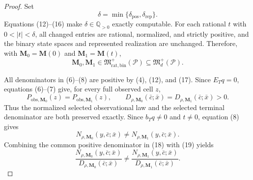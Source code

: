 \documentclass{article}
\begin{document}
\begin{proof}
Set
\[
 \delta=\min\{\delta_{\mathrm{pos}},\delta_{\mathrm{rep}}\}. \tag{16}
\]
Equations (12)--(16) make \(\delta\in\mathbb Q_{>0}\) exactly computable.  For each rational \(t\) with \(0<|t|<\delta\), all changed entries are rational, normalized, and strictly positive, and the binary state spaces and represented realization are unchanged.  Therefore, with \(\mathbf M_0=\mathbf M(0)\) and \(\mathbf M_1=\mathbf M(t)\),
\[
 \mathbf M_0,\mathbf M_1
 \in\mathfrak M_{\mathrm{rat,bin}}^+(\mathcal P)
 \subseteq\mathfrak M_d^+(\mathcal P).                         \tag{17}
\]

All denominators in (6)--(8) are positive by (4), (12), and (17).  Since \(E_Tq=0\), equations (6)--(7) give, for every full observed cell \(z\),
\[
 P_{\mathrm{obs},\mathbf M_0}(z)=P_{\mathrm{obs},\mathbf M_1}(z),
 \qquad
 D_{\rho,\mathbf M_0}(\bar c;\bar x)
 =D_{\rho,\mathbf M_1}(\bar c;\bar x)>0.                     \tag{18}
\]
Thus the normalized selected observational law and the selected terminal denominator are both preserved exactly.  Since \(b_Tq\ne0\) and \(t\ne0\), equation (8) gives
\[
 N_{\rho,\mathbf M_0}(y,\bar c;\bar x)
 \ne N_{\rho,\mathbf M_1}(y,\bar c;\bar x).                 \tag{19}
\]
Combining the common positive denominator in (18) with (19) yields
\[
 \frac{N_{\rho,\mathbf M_0}(y,\bar c;\bar x)}
      {D_{\rho,\mathbf M_0}(\bar c;\bar x)}
 \ne
 \frac{N_{\rho,\mathbf M_1}(y,\bar c;\bar x)}
      {D_{\rho,\mathbf M_1}(\bar c;\bar x)}.                 \tag{20}
\]


\end{proof}
\end{document}
